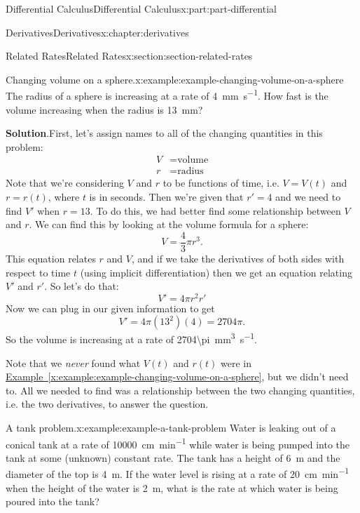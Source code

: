 \documentclass[twoside,10pt,]{book}
\newcommand{\blocktitlefont}{\relax}
\newcommand{\xreffont}{\relax}
\numberwithin{equation}{part}
\begin{document}
\begin{partptx}{Differential Calculus}{}{Differential Calculus}{}{}{x:part:part-differential}
\begin{chapterptx}{Derivatives}{}{Derivatives}{}{}{x:chapter:derivatives}
\typeout{************************************************}
%
\begin{sectionptx}{Related Rates}{}{Related Rates}{}{}{x:section:section-related-rates}
\begin{example}{Changing volume on a sphere.}{x:example:example-changing-volume-on-a-sphere}%
The radius of a sphere is increasing at a rate of \SI{4}{\milli\meter\per\second}. How fast is the volume increasing when the radius is \SI{13}{\milli\meter}?%
\par\smallskip%
\noindent\textbf{\blocktitlefont Solution}.\hypertarget{g:solution:idm35150998627264}{}\quad{}First, let's assign names to all of the changing quantities in this problem:%
\begin{align*}
V & = \text{volume} \\
r & = \text{radius} 
\end{align*}
Note that we're considering \(V\) and \(r\) to be functions of time, i.e. \(V = V(t)\) and \(r=r(t)\), where \(t\) is in seconds. Then we're given that \(r' = 4\) and we need to find \(V'\) when \(r=13\). To do this, we had better find some relationship between \(V\) and \(r\). We can find this by looking at the volume formula for a sphere:%
\begin{equation*}
V = \frac{4}{3}\pi r^{3}.
\end{equation*}
This equation relates \(r\) and \(V\), and if we take the derivatives of both sides with respect to time \(t\) (using implicit differentiation) then we get an equation relating \(V'\) and \(r'\). So let's do that:%
\begin{equation*}
V' = 4\pi r^{2}r'
\end{equation*}
Now we can plug in our given information to get%
\begin{equation*}
V' = 4\pi(13^{2})(4) = 2704\pi.
\end{equation*}
So the volume is increasing at a rate of \SI{2704\pi}{\milli\meter\tothe{3}\per\second}.%
\end{example}
Note that we \emph{never} found what \(V(t)\) and \(r(t)\) were in \hyperref[x:example:example-changing-volume-on-a-sphere]{Example~{\xreffont\ref{x:example:example-changing-volume-on-a-sphere}}}, but we didn't need to. All we needed to find was a relationship between the two changing quantities, i.e. the two derivatives, to answer the question.%
\begin{example}{A tank problem.}{x:example:example-a-tank-problem}%
Water is leaking out of a conical tank at a rate of \SI{10000}{\centi\meter\per\minute} while water is being pumped into the tank at some (unknown) constant rate. The tank has a height of \SI{6}{\meter} and the diameter of the top is \SI{4}{\meter}. If the water level is rising at a rate of \SI{20}{\centi\meter\per\minute} when the height of the water is \SI{2}{\meter}, what is the rate at which water is being poured into the tank?%

\end{example}
\end{sectionptx}
\end{chapterptx}
\end{partptx}
\end{document}
